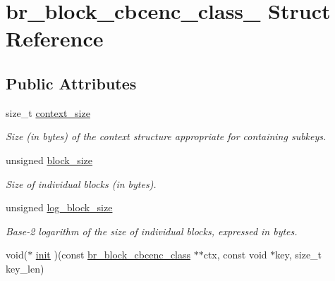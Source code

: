 \hypertarget{structbr__block__cbcenc__class__}{}\section{br\+\_\+block\+\_\+cbcenc\+\_\+class\+\_\+ Struct Reference}
\label{structbr__block__cbcenc__class__}
\subsection*{Public Attributes}
\begin{DoxyCompactItemize}
\item 
\mbox{\label{structbr__block__cbcenc__class___ae731a8e995309f146d78b3877145c110}} 
size\+\_\+t \hyperlink{structbr__block__cbcenc__class___ae731a8e995309f146d78b3877145c110}{context\+\_\+size}
\begin{DoxyCompactList}\small\item\em Size (in bytes) of the context structure appropriate for containing subkeys. \end{DoxyCompactList}\item 
\mbox{\label{structbr__block__cbcenc__class___a2c42f682029f08d66eb025ae1c732834}} 
unsigned \hyperlink{structbr__block__cbcenc__class___a2c42f682029f08d66eb025ae1c732834}{block\+\_\+size}
\begin{DoxyCompactList}\small\item\em Size of individual blocks (in bytes). \end{DoxyCompactList}\item 
\mbox{\label{structbr__block__cbcenc__class___a541cb6678a10f233ad918e5a2220f5cf}} 
unsigned \hyperlink{structbr__block__cbcenc__class___a541cb6678a10f233ad918e5a2220f5cf}{log\+\_\+block\+\_\+size}
\begin{DoxyCompactList}\small\item\em Base-\/2 logarithm of the size of individual blocks, expressed in bytes. \end{DoxyCompactList}\item 
void($\ast$ \hyperlink{structbr__block__cbcenc__class___ab148e2bacebbee1588b9c7c0847a7d42}{init} )(const \hyperlink{bearssl__block_8h_ad0ecff523e21a74dc1143dcfa52aa251}{br\+\_\+block\+\_\+cbcenc\+\_\+class} $\ast$$\ast$ctx, const void $\ast$key, size\+\_\+t key\+\_\+len)
$$
\end{DoxyCompactItemize}

